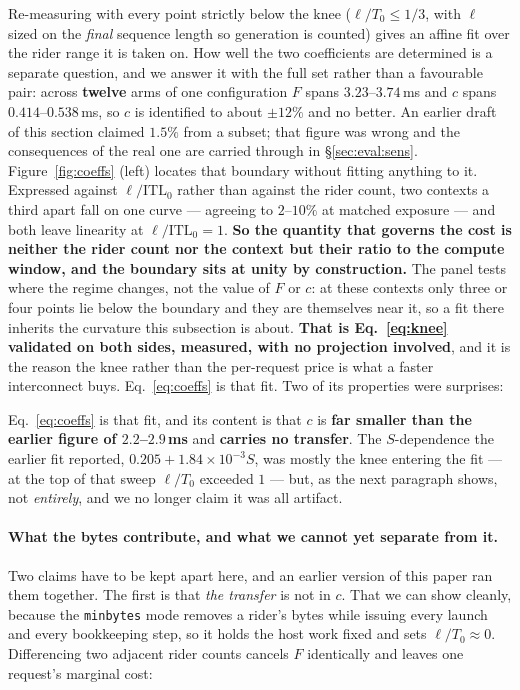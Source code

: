 Re-measuring with every point strictly below the knee ($\ell/T_0 \le 1/3$, with
$\ell$ sized on the \emph{final} sequence length so generation is counted) gives an
affine fit over the rider range it is taken on. How well the two coefficients are
determined is a separate question, and we answer it with the full set rather than a
favourable pair: across \textbf{twelve} arms of one configuration $F$ spans
$3.23$--$3.74$\,ms and $c$ spans $\mathbf{0.414}$--$\mathbf{0.538}$\,ms, so $c$ is
identified to about $\pm 12\%$ and no better. An earlier draft of this section
claimed $1.5\%$ from a subset; that figure was wrong and the consequences of the
real one are carried through in \S\ref{sec:eval:sens}.
Figure~\ref{fig:coeffs} (left) locates that boundary without fitting anything to
it. Expressed against $\ell/\mathrm{ITL}_0$ rather than against the rider count, two
contexts a third apart fall on one curve --- agreeing to $2$--$10\%$ at matched
exposure --- and both leave linearity at $\ell/\mathrm{ITL}_0 = 1$. \textbf{So the
quantity that governs the cost is neither the rider count nor the context but their
ratio to the compute window, and the boundary sits at unity by construction.} The
panel tests where the regime changes, not the value of $F$ or $c$: at these
contexts only three or four points lie below the boundary and they are themselves
near it, so a fit there inherits the curvature this subsection is about. \textbf{That is
Eq.~\ref{eq:knee} validated on both sides, measured, with no projection involved},
and it is the reason the knee rather than the per-request price is what a faster
interconnect buys.
Eq.~\ref{eq:coeffs} is that fit. Two of its properties were surprises:

Eq.~\ref{eq:coeffs} is that fit, and its content is that $c$ is \textbf{far smaller
than the earlier figure of $2.2$--$2.9$\,ms} and \textbf{carries no transfer}. The
$S$-dependence the earlier fit reported, $0.205 + 1.84\times10^{-3}S$, was mostly
the knee entering the fit --- at the top of that sweep $\ell/T_0$ exceeded $1$ ---
but, as the next paragraph shows, not \emph{entirely}, and we no longer claim it was
all artifact.

\paragraph{What the bytes contribute, and what we cannot yet separate from it.}
Two claims have to be kept apart here, and an earlier version of this paper ran
them together. The first is that \emph{the transfer} is not in $c$. That we can show
cleanly, because the \texttt{minbytes} mode removes a rider's bytes while issuing
every launch and every bookkeeping step, so it holds the host work fixed and sets
$\ell/T_0 \approx 0$. Differencing two adjacent rider counts cancels $F$ identically
and leaves one request's marginal cost:

